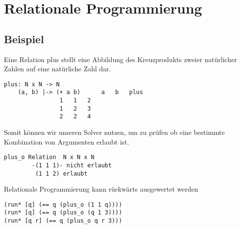 \section{Relationale Programmierung}



\subsection{Beispiel}

Eine Relation plus stellt eine Abbildung des Kreuzprodukts zweier natürlicher Zahlen auf eine natürliche Zahl dar.

\begin{lstlisting}
plus: N x N -> N
    (a, b) |-> (+ a b)		a   b   plus
				1   1   2
				1   2   3
				2   2   4
\end{lstlisting}

Somit können wir unseren Solver nutzen, um zu prüfen ob eine bestimmte Kombination von Argumenten erlaubt ist.
\begin{lstlisting}
plus_o Relation	 N x N x N
		-(1 1 1)- nicht erlaubt
		 (1 1 2) erlaubt
\end{lstlisting}

Relationale Programmierung kann rückwärts ausgewertet werden

\begin{lstlisting}
(run* [q] (== q (plus_o (1 1 q))))
(run* [q] (== q (plus_o (q 1 3))))
(run* [q r] (== q (plus_o q r 3)))
\end{lstlisting}


